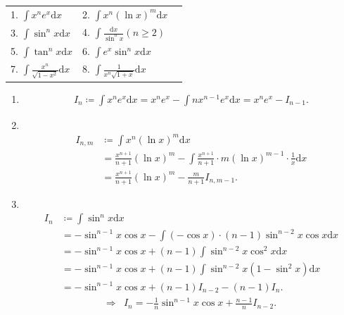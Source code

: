 \begin{center}
\begin{tabular}{l l l}
    1. $\displaystyle \int x^n e^x \mathrm{d}x$ 
    & 2. $\displaystyle\int x^n (\ln x)^m \mathrm{d}x$ \\
    3. $\displaystyle\int \sin^n x \mathrm{d}x$ 
    & 4. $\displaystyle\int \frac{\mathrm{d}x}{\sin^n x} (n \geq 2)$\\
    5. $\displaystyle\int \tan^n x \mathrm{d}x$ 
    & 6. $\displaystyle\int e^x \sin^n x \mathrm{d}x$\\
    7. $\displaystyle\int \frac{x^n}{\sqrt{1 - x^2}} \mathrm{d}x$
    & 8. $\displaystyle\int \frac{1}{x^n \sqrt{1 + x}} \mathrm{d}x$
\end{tabular}
\end{center}
\begin{solution}
    \begin{enumerate}
    \item[1.]
    \[
    \begin{aligned}
    I_{n}\coloneqq\int x^ne^x\mathrm{d}x=x^ne^x-\int nx^{n-1}e^x\mathrm{d}x=x^ne^x-I_{n-1}.
    \end{aligned}
    \]

    \item[2.]\\
    \[
    \begin{aligned}
    I_{n,m}&\coloneqq\int x^n\left(\ln{x}\right)^m\mathrm{d}x\\
    &=\frac{x^{n+1}}{n+1}\left(\ln{x}\right)^m-\int\frac{x^{n+1}}{n+1}\cdot m\left(\ln{x}\right)^{m-1}\cdot\frac{1}{x}\mathrm{d}x\\
    &=\frac{x^{n+1}}{n+1}\left(\ln{x}\right)^m-\frac{m}{n+1}I_{n,m-1}.
    \end{aligned}
    \]

    \item[3.]\\
    \[
    \begin{aligned}
    I_{n}&\coloneqq \int\sin^n{x}\mathrm{d}x\\
    &=-\sin^{n-1}{x}\cos{x}-\int(-\cos{x})\cdot(n-1)\sin^{n-2}{x}\cos{x}\mathrm{d}x\\
    &=-\sin^{n-1}{x}\cos{x}+(n-1)\int\sin^{n-2}{x}\cos^2{x}\mathrm{d}x\\
    &=-\sin^{n-1}{x}\cos{x}+(n-1)\int\sin^{n-2}{x}(1-\sin^2{x})\mathrm{d}x\\
    &=-\sin^{n-1}{x}\cos{x}+(n-1)I_{n-2}-(n-1)I_{n}.
    \end{aligned}
    \]
    \[
    \begin{aligned}
    \Rightarrow &I_{n}=-\frac{1}{n}\sin^{n-1}{x}\cos{x}+\frac{n-1}{n}I_{n-2}.
    \end{aligned}
    \]


\end{enumerate}
\end{solution}
